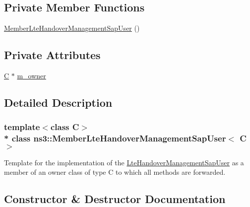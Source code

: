 \subsection*{Private Member Functions}
\begin{DoxyCompactItemize}
\item 
\hyperlink{classns3_1_1MemberLteHandoverManagementSapUser_a178b4a88f2e3d1a5dac1352acf550c60}{Member\+Lte\+Handover\+Management\+Sap\+User} ()
\end{DoxyCompactItemize}
\subsection*{Private Attributes}
\begin{DoxyCompactItemize}
\item 
\hyperlink{loss__COST231__small__cities__urban_8m_aaa53ca0b650dfd85c4f59fa156f7a2cc}{C} $\ast$ \hyperlink{classns3_1_1MemberLteHandoverManagementSapUser_a6217b997d53e144941aab7858a0990d1}{m\+\_\+owner}
\end{DoxyCompactItemize}


\subsection{Detailed Description}
\subsubsection*{template$<$class C$>$\\*
class ns3\+::\+Member\+Lte\+Handover\+Management\+Sap\+User$<$ C $>$}

Template for the implementation of the \hyperlink{classns3_1_1LteHandoverManagementSapUser}{Lte\+Handover\+Management\+Sap\+User} as a member of an owner class of type C to which all methods are forwarded. 

\subsection{Constructor \& Destructor Documentation}
